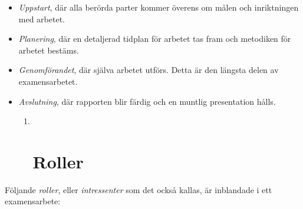 \begin{itemize}
\item
  \emph{Uppstart}, där alla berörda parter kommer överens om målen och
  inriktningen med arbetet.
\item
  \emph{Planering}, där en detaljerad tidplan för arbetet tas fram och
  metodiken för arbetet bestäms.
\item
  \emph{Genomförandet}, där själva arbetet utförs. Detta är den längsta
  delen av examensarbetet.
\item
  \emph{Avslutning}, där rapporten blir färdig och en muntlig
  presentation hålls.

  \begin{enumerate}
  \def\labelenumi{\arabic{enumi}.}
  \item ~
    \section{Roller }\label{roller}
  \end{enumerate}
\end{itemize}

Följande \emph{roller}, eller \emph{intressenter} som det också kallas,
är inblandade i ett examensarbete:

